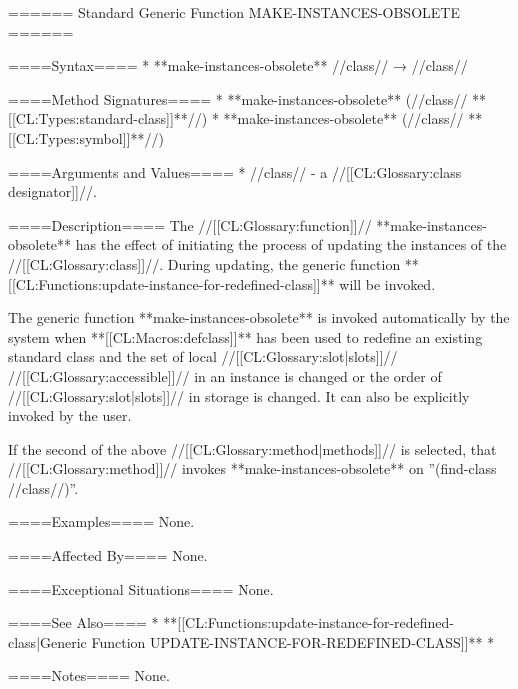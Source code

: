 ====== Standard Generic Function MAKE-INSTANCES-OBSOLETE ======

====Syntax====
  * **make-instances-obsolete** //class// → //class//

====Method Signatures====
  * **make-instances-obsolete** (//class// **[[CL:Types:standard-class]]**//)
  * **make-instances-obsolete** (//class// **[[CL:Types:symbol]]**//)

====Arguments and Values====
  * //class// - a //[[CL:Glossary:class designator]]//.

====Description====
The //[[CL:Glossary:function]]// **make-instances-obsolete** has the effect of initiating the process of updating the instances of the //[[CL:Glossary:class]]//. During updating, the generic function **[[CL:Functions:update-instance-for-redefined-class]]** will be invoked.

The generic function **make-instances-obsolete** is invoked automatically by the system when **[[CL:Macros:defclass]]** has been used to redefine an existing standard class and the set of local //[[CL:Glossary:slot|slots]]// //[[CL:Glossary:accessible]]// in an instance is changed or the order of //[[CL:Glossary:slot|slots]]// in storage is changed. It can also be explicitly invoked by the user.

If the second of the above //[[CL:Glossary:method|methods]]// is selected, that //[[CL:Glossary:method]]// invokes **make-instances-obsolete** on ''(find-class //class//)''.

====Examples====
None.

====Affected By====
None.

====Exceptional Situations====
None.

====See Also====
  * **[[CL:Functions:update-instance-for-redefined-class|Generic Function UPDATE-INSTANCE-FOR-REDEFINED-CLASS]]**
  * {\secref\ClassReDef}

====Notes====
None.

